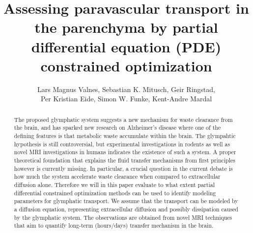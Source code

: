 \documentclass[12pt,a4paper]{article}
\title{Assessing paravascular transport in the parenchyma by partial differential equation (PDE) constrained optimization}
\author{Lars Magnus Valnes, Sebastian K. Mitusch, Geir Ringstad, \\ 
Per Kristian Eide, Simon W. Funke, Kent-Andre Mardal }
\begin{document}
\maketitle

\begin{abstract}
The proposed glymphatic system suggests a new mechanism for waste clearance from the brain, and has sparked new research on Alzheimer's disease where one of the defining features
is that metabolic waste accumulate within the brain. The glympahtic hypothesis is still controversial, but experimental investigations in rodents as well as novel MRI investigations in humans indicates the existence of such a system. A proper theoretical foundation 
that explains the fluid transfer mechanisms from first principles however is currently missing.
In particular, a crucial question in the current debate is how much the system accelerate
waste clearance when compared to extracellular diffusion alone. Therefore
we will in this paper evaluate to what extent partial differential constrained optimization methods can be used to identify modeling parameters for glymphatic transport. We assume that the transport can be modeled by a diffusion equation, representing extracellular diffusion and possibly dissipation caused by the glymphatic system. The observations are obtained from novel MRI techniques that
aim to quantify long-term (hours/days) transfer mechanism in the brain. 

\end{abstract}
\end{document}

